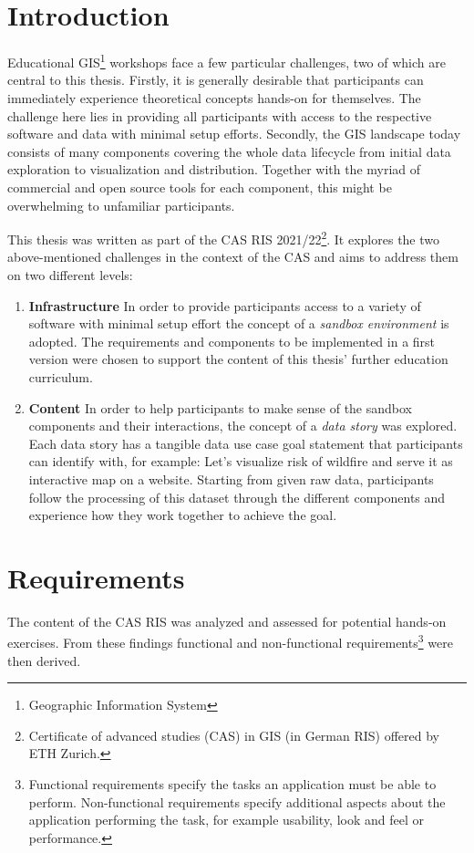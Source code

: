 \documentclass[11pt, a4paper, oneside, parskip=full-]{scrartcl}
\begin{document}
\section{Introduction}
Educational GIS\footnote{Geographic Information System} workshops face a few
particular challenges, two of which are central to this thesis. Firstly, it is
generally desirable that participants can immediately experience theoretical
concepts hands-on for themselves. The challenge here lies in providing all
participants with access to the respective software and data with minimal setup
efforts. Secondly, the GIS landscape today consists of many components covering
the whole data lifecycle from initial data exploration to visualization and
distribution. Together with the myriad of commercial and open source tools for
each component, this might be overwhelming to unfamiliar participants.

This thesis was written as part of the CAS RIS 2021/22\footnote{Certificate of
advanced studies (CAS) in GIS (in German RIS) offered by ETH Zurich.}. It
explores the two above-mentioned challenges in the context of the CAS and aims
to address them on two different levels:
\begin{enumerate}
  \item \textbf{Infrastructure} In order to provide participants access to a
  variety of software with minimal setup effort the concept of a \emph{sandbox
  environment} is adopted. The requirements and components to be implemented in
  a first version were chosen to support the content of this thesis' further
  education curriculum.
  \item \textbf{Content} In order to help participants to make sense of the
  sandbox components and their interactions, the concept of a \emph{data story}
  was explored. Each data story has a tangible data use case goal statement that
  participants can identify with, for example: Let's visualize risk of wildfire
  and serve it as interactive map on a website. Starting from given raw data,
  participants follow the processing of this dataset through the different
  components and experience how they work together to achieve the goal.
\end{enumerate}


\section{Requirements} \label{sectionrequirements} The content of the CAS RIS
was analyzed and assessed for potential hands-on exercises. From these findings
functional and non-functional requirements\footnote{Functional requirements
specify the tasks an application must be able to perform. Non-functional
requirements specify additional aspects about the application performing the
task, for example usability, look and feel or performance. } were then derived.
\end{document}
